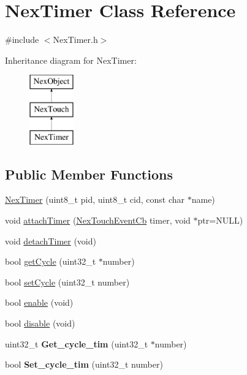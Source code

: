 \hypertarget{class_nex_timer}{\section{Nex\+Timer Class Reference}
\label{class_nex_timer}
}


{\ttfamily \#include $<$Nex\+Timer.\+h$>$}

Inheritance diagram for Nex\+Timer\+:\begin{figure}[H]
\begin{center}
\leavevmode
\includegraphics[height=3.000000cm]{class_nex_timer}
\end{center}
\end{figure}
\subsection*{Public Member Functions}
\begin{DoxyCompactItemize}
\item 
\hyperlink{class_nex_timer_a5cb6cdcf0d7e46723364d486d4dcd650}{Nex\+Timer} (uint8\+\_\+t pid, uint8\+\_\+t cid, const char $\ast$name)
\item 
void \hyperlink{class_nex_timer_ae6f1ae95ef40b8bc6f482185b1ec5175}{attach\+Timer} (\hyperlink{group___touch_event_ga162dea47b078e8878d10d6981a9dd0c6}{Nex\+Touch\+Event\+Cb} timer, void $\ast$ptr=N\+U\+L\+L)
\item 
void \hyperlink{class_nex_timer_a365d08df4623ce8a146e73ff9204d5cb}{detach\+Timer} (void)
\item 
bool \hyperlink{class_nex_timer_afd95e7490e28e2a36437be608f26b40e}{get\+Cycle} (uint32\+\_\+t $\ast$number)
\item 
bool \hyperlink{class_nex_timer_acf20f76949ed43f05b1c33613dabcb01}{set\+Cycle} (uint32\+\_\+t number)
\item 
bool \hyperlink{class_nex_timer_a01c146befad40fc0321891ac69e75710}{enable} (void)
\item 
bool \hyperlink{class_nex_timer_ae016d7d39ede6cf813221b26691809f1}{disable} (void)
\item 
\hypertarget{class_nex_timer_ae186b1c014e8bf67036f8a5faf73ae67}{uint32\+\_\+t {\bfseries Get\+\_\+cycle\+\_\+tim} (uint32\+\_\+t $\ast$number)}\label{class_nex_timer_ae186b1c014e8bf67036f8a5faf73ae67}

\item 
\hypertarget{class_nex_timer_a30829813c0c42680c1f7bcf5fc5b7c8b}{bool {\bfseries Set\+\_\+cycle\+\_\+tim} (uint32\+\_\+t number)}\label{class_nex_timer_a30829813c0c42680c1f7bcf5fc5b7c8b}

\end{DoxyCompactItemize}

